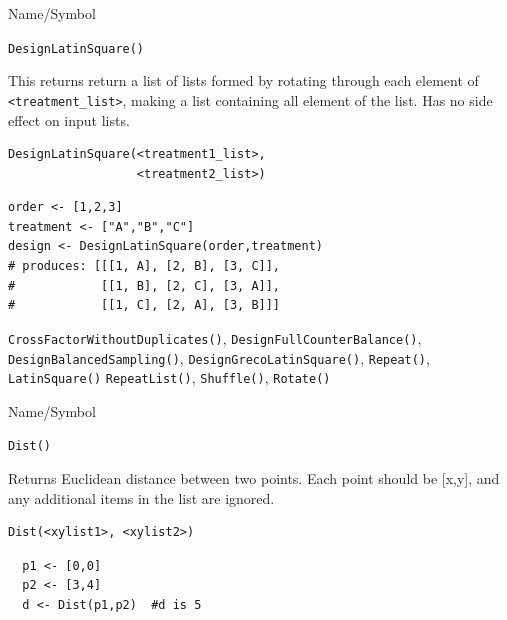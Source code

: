 \begin{desc}{Name/Symbol}
\item[Name/Symbol]	\verb+DesignLatinSquare()+

\item[Description] This returns return a list of lists formed by
  rotating through each element of \verb+<treatment_list>+, making a
  list containing all element of the list. Has no side effect on input
  lists.  

\item[Usage]
\begin{verbatim}
DesignLatinSquare(<treatment1_list>, 
                  <treatment2_list>)
\end{verbatim}

\item[Example]
\begin{verbatim}
order <- [1,2,3]
treatment <- ["A","B","C"]
design <- DesignLatinSquare(order,treatment)
# produces: [[[1, A], [2, B], [3, C]],
#            [[1, B], [2, C], [3, A]],
#            [[1, C], [2, A], [3, B]]]
\end{verbatim}

\item[See Also] \verb+CrossFactorWithoutDuplicates()+,
  \verb+DesignFullCounterBalance()+, \verb+DesignBalancedSampling()+,
  \verb+DesignGrecoLatinSquare()+, \verb+Repeat()+, \verb+LatinSquare()+
  \verb+RepeatList()+, \verb+Shuffle()+, \verb+Rotate()+
\end{desc}




\begin{desc}{Name/Symbol}
\item[Name/Symbol]	\verb+Dist()+

\item[Description] Returns Euclidean distance between two points.
  Each point should be [x,y], and any additional items in the list are
  ignored.  


\item[Usage]
\begin{verbatim}
Dist(<xylist1>, <xylist2>)
\end{verbatim}

\item[Example]	
\begin{verbatim}
  p1 <- [0,0]
  p2 <- [3,4]
  d <- Dist(p1,p2)  #d is 5
\end{verbatim}
\item[See Also]	
\end{desc}





